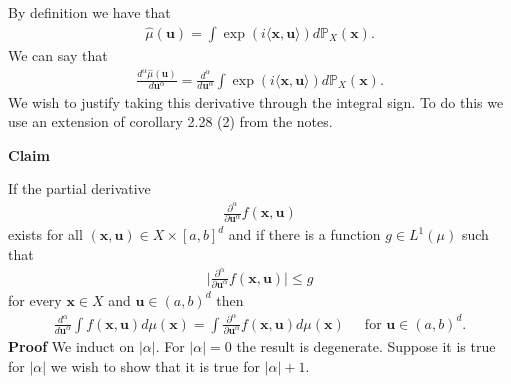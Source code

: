 \documentclass{unswmaths}
\begin{document}
\subsection{}
By definition we have that
\begin{align}
	\hat{\mu}(\mathbf{u}) = \int \exp(i \langle \mathbf{x}, \mathbf{u} \rangle ) d\mathbb{P}_{X}(\mathbf{x}).
\end{align}
We can say that
\begin{align}
	\frac{d^\alpha \hat{\mu}(\mathbf{u})}{d \mathbf{u}^\alpha} = \frac{d^\alpha}{d \mathbf{u}^\alpha} \int \exp(i \langle \mathbf{x}, \mathbf{u} \rangle ) d\mathbb{P}_{X}(\mathbf{x}).
\end{align}
We wish to justify taking this derivative through the integral sign. To do this we use an extension of corollary 2.28 (2) from the notes.
\clearpage
\begin{mdframed}
\textbf{Claim}

If the partial derivative 
\begin{align}
	\frac{\partial^\alpha}{\partial\mathbf{u}^\alpha} f(\mathbf{x}, \mathbf{u})
\end{align}
exists for all $ (\mathbf{x}, \mathbf{u}) \in X \times [a, b]^d $ and if there is a function $ g \in L^{1}(\mu) $ such that
\begin{align}
	\Big| \frac{\partial^\alpha}{\partial \mathbf{u}^\alpha} f(\mathbf{x}, \mathbf{u}) \Big| \leq g
\end{align}
for every $ \mathbf{x} \in X $ and $ \mathbf{u} \in (a,b)^d $ then
\begin{align}
	\frac{d^\alpha}{d\mathbf{u}^\alpha} \int f(\mathbf{x}, \mathbf{u}) d\mu(\mathbf{x}) = \int \frac{\partial^\alpha}{\partial \mathbf{u}^\alpha} f(\mathbf{x}, \mathbf{u}) d\mu(\mathbf{x}) \ \ \ \ \ \text{ for } \mathbf{u} \in (a,b)^d.
\end{align}
\textbf{Proof}
We induct on $ |\alpha| $. For $ |\alpha| = 0 $ the result is degenerate.
Suppose it is true for $ |\alpha| $ we wish to show that it is true for $ |\alpha| + 1 $.
\end{mdframed}
\end{document}
